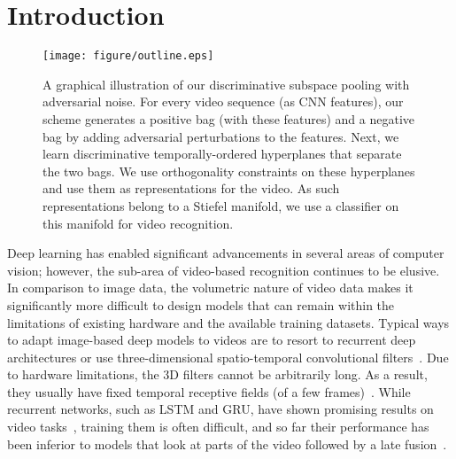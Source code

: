 \documentclass[runningheads]{llncs}
\begin{document}
%
 \section{Introduction}
\label{intro}
\begin{figure}
	\begin{center}
        \texttt{[image: figure/outline.eps]}
	\end{center}
	\caption{A graphical illustration of our discriminative subspace pooling with adversarial noise. For every video sequence (as CNN features), our scheme generates a positive bag (with these features) and a negative bag by adding adversarial perturbations to the features. Next, we learn discriminative temporally-ordered hyperplanes that separate the two bags. We use orthogonality constraints on these hyperplanes and use them as representations for the video. As such representations belong to a Stiefel manifold, we use a classifier on this manifold for video recognition. }
	\label{fig:1}
\end{figure}

Deep learning has enabled significant advancements in several areas of computer vision; however, the sub-area of video-based recognition continues to be elusive. In comparison to image data, the volumetric nature of video data makes it significantly more difficult to design models that can remain within the limitations of existing hardware and the available training datasets. Typical ways to adapt  image-based deep models to videos are to resort to recurrent deep architectures or use three-dimensional spatio-temporal convolutional filters~\cite{carreira2017quo,tran2015learning,simonyan2014two}. Due to hardware limitations, the 3D filters cannot be arbitrarily long. As a result, they usually have fixed  temporal receptive fields (of a few frames)~\cite{tran2015learning}. While recurrent networks, such as LSTM and GRU, have shown promising results on video tasks~\cite{zhu2016co,liu2016spatio,ballas2015delving}, training them is often difficult, and so far their performance has been inferior to models that look at parts of the video followed by a late fusion~\cite{carreira2017quo,simonyan2013deep}.
\end{document}

